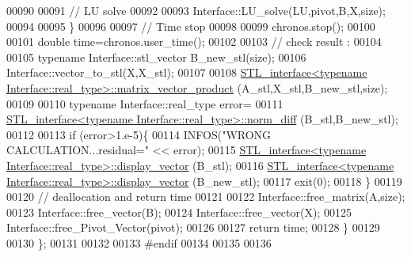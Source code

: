 \begin{DoxyCode}
00090       
00091       \textcolor{comment}{// LU solve}
00092 
00093       Interface::LU\_solve(LU,pivot,B,X,size);
00094 
00095     \}
00096 
00097     \textcolor{comment}{// Time stop}
00098 
00099     chronos.stop();
00100 
00101     \textcolor{keywordtype}{double} time=chronos.user\_time();
00102   
00103     \textcolor{comment}{// check result :}
00104 
00105     \textcolor{keyword}{typename} Interface::stl\_vector B\_new\_stl(size);
00106     Interface::vector\_to\_stl(X,X\_stl);
00107 
00108     \hyperlink{class_s_t_l__interface}{STL\_interface<typename Interface::real\_type>::matrix\_vector\_product}
      (A\_stl,X\_stl,B\_new\_stl,size); 
00109   
00110     \textcolor{keyword}{typename} Interface::real\_type error=
00111       \hyperlink{class_s_t_l__interface}{STL\_interface<typename Interface::real\_type>::norm\_diff}
      (B\_stl,B\_new\_stl);
00112     
00113     \textcolor{keywordflow}{if} (error>1.e-5)\{
00114       INFOS(\textcolor{stringliteral}{"WRONG CALCULATION...residual="} << error);
00115       \hyperlink{class_s_t_l__interface}{STL\_interface<typename Interface::real\_type>::display\_vector}
      (B\_stl);
00116       \hyperlink{class_s_t_l__interface}{STL\_interface<typename Interface::real\_type>::display\_vector}
      (B\_new\_stl);
00117       exit(0);
00118     \}
00119     
00120     \textcolor{comment}{// deallocation and return time}
00121     
00122     Interface::free\_matrix(A,size);
00123     Interface::free\_vector(B);
00124     Interface::free\_vector(X);
00125     Interface::free\_Pivot\_Vector(pivot);
00126 
00127     \textcolor{keywordflow}{return} time;
00128   \}
00129 
00130 \};
00131   
00132 
00133 \textcolor{preprocessor}{#endif}
00134 
00135 
00136 
\end{DoxyCode}

